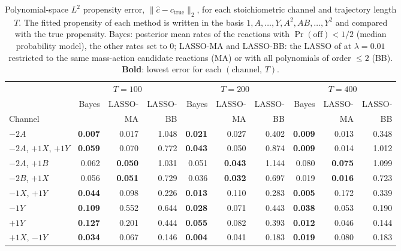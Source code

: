 \begin{table}[htbp]
\centering
\small
\caption{%
  Polynomial-space $L^2$ propensity error, $\|\hat{c} - c_{\mathrm{true}}\|_2$, for each stoichiometric
  channel and trajectory length $T$. The fitted propensity of each method is written in the basis
  $1, A, \dots, Y, A^2, AB, \dots, Y^2$ and compared with the true propensity. Bayes: posterior mean rates of the reactions with
  $\Pr(\text{off})<1/2$ (median probability model), the other rates set to $0$;
  LASSO-MA and LASSO-BB: the LASSO of \cite{siam_Zhang2019} at $\lambda = 0.01$
  restricted to the same mass-action candidate reactions (MA) or with all polynomials of order $\le 2$ (BB).
  \textbf{Bold}: lowest error for each $(\text{channel},\,T)$.
}
\label{tab:comparison-l2}
\setlength{\tabcolsep}{2.5pt}
\begin{tabular}{l rrr rrr rrr}
\toprule
\multicolumn{1}{c}{} & \multicolumn{3}{c}{$T=100$} & \multicolumn{3}{c}{$T=200$} & \multicolumn{3}{c}{$T=400$} \\
\cmidrule(lr){2-4}\cmidrule(lr){5-7}\cmidrule(lr){8-10}
 & Bayes & LASSO- & LASSO- & Bayes & LASSO- & LASSO- & Bayes & LASSO- & LASSO- \\
Channel & & MA & BB & & MA & BB & & MA & BB \\
\midrule
$-2A$ & \textbf{0.007} & 0.017 & 1.048 & \textbf{0.021} & 0.027 & 0.402 & \textbf{0.009} & 0.013 & 0.348 \\
$-2A$, $+1X$, $+1Y$ & \textbf{0.059} & 0.070 & 0.772 & \textbf{0.043} & 0.050 & 0.874 & \textbf{0.009} & 0.014 & 1.012 \\
$-2A$, $+1B$ & 0.062 & \textbf{0.050} & 1.031 & 0.051 & \textbf{0.043} & 1.144 & 0.080 & \textbf{0.075} & 1.099 \\
$-2B$, $+1X$ & 0.056 & \textbf{0.051} & 0.729 & 0.036 & \textbf{0.032} & 0.697 & 0.019 & \textbf{0.016} & 0.723 \\
$-1X$, $+1Y$ & \textbf{0.044} & 0.098 & 0.226 & \textbf{0.013} & 0.110 & 0.283 & \textbf{0.005} & 0.172 & 0.339 \\
$-1Y$ & \textbf{0.109} & 0.552 & 0.644 & \textbf{0.028} & 0.071 & 0.443 & \textbf{0.038} & 0.053 & 0.190 \\
$+1Y$ & \textbf{0.127} & 0.201 & 0.444 & \textbf{0.055} & 0.082 & 0.393 & \textbf{0.012} & 0.046 & 0.144 \\
$+1X$, $-1Y$ & \textbf{0.034} & 0.067 & 0.146 & \textbf{0.004} & 0.041 & 0.183 & \textbf{0.019} & 0.080 & 0.183 \\

\end{tabular}
\end{table}
